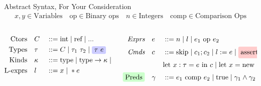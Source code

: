 \documentclass[aspectratio=169]{beamer}
\begin{document}
\begin{frame}{Abstract Syntax, For Your Consideration}
\begin{gather*}
    x,y \in \text{Variables}
    \quad
    \text{op} \in \text{Binary ops}
    \quad
    n \in \text{Integers}
    \quad
    \text{comp} \in \text{Comparison Ops}
\end{gather*}

\vspace{0.2in}

\begin{columns}[T]
\begin{column}{0.45\textwidth}
\begin{alignat*}{2}
\text{Ctors}\quad &C &&::= \text{int} \altm \text{ref} \altm ...
\\
\text{Types}\quad &\tau &&::= C \altm \tau_1 \ \tau_2 \altm \colorIt{blue}{n1}{\tau\ e}
\\
\text{Kinds}\quad & \kappa &&::= \text{type} \altm \text{type} \rightarrow \kappa \altm \tau \rightarrow \kappa
\\
\text{L-exprs} \quad &l &&::= x \altm *e
\end{alignat*}
\end{column}

\begin{column}{0.45\textwidth}
\begin{alignat*}{2}
\textit{Exprs}\quad &e &&::= n \altm l \altm e_1 \text{ op } e_2
\\
\textit{Cmds}\quad &c &&::= \text{skip} \altm c_1;c_2 \altm l := e \altm \colorIt{red}{n2}{\text{assert}(\gamma)} \altm
\\
~ & ~ && \text{let } x : \tau = e \text { in } c \altm \text{let } x = \text{new } \tau(e) \text{ in } c
\\
\colorIt{green}{n3}{\text{Preds}} \quad &\gamma &&::= e_1 \text{ comp } e_2 \altm \text{true} \altm \gamma_1 \wedge \gamma_2
\end{alignat*}
\end{column}
\end{columns}

\vspace{0.1in}
\end{frame}


\end{document}
